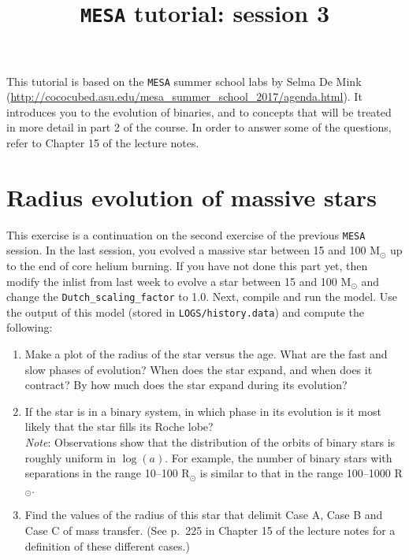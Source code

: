 \documentclass[11pt,a4paper]{article}
\begin{document}
\title{\textbf{\texttt{MESA} tutorial: session 3}}
\author{}
\date{}
\maketitle

\noindent
This tutorial is based on the \texttt{MESA} summer school labs by Selma De Mink (\url{http://cococubed.asu.edu/mesa_summer_school_2017/agenda.html}). It introduces you to the evolution of binaries, and to concepts that will be treated in more detail in part 2 of the course. In order to answer some of the questions, refer to Chapter 15 of the lecture notes.

\section{Radius evolution of massive stars}

This exercise is a continuation on the second exercise of the previous \texttt{MESA} session. In the last session, you evolved a massive star between 15 and 100 M$_\odot$ up to the end of core helium burning. If you have not done this part yet, then modify the inlist from last week to evolve a star between 15 and 100 M$_\odot$ and change the \verb|Dutch_scaling_factor| to 1.0. Next, compile and run the model. Use the output of this model (stored in \verb|LOGS/history.data|) and compute the following:
\begin{enumerate}
\item Make a plot of the radius of the star versus the age. What are the fast and slow phases of evolution? When does the star expand, and when does it contract? By how much does the star expand during its evolution?
\item If the star is in a binary system, in which phase in its evolution is it most likely that the star fills its Roche lobe?\\
\textit{Note}: Observations show that the distribution of the orbits of binary stars is roughly uniform in $\log(a)$. For example, the number of binary stars with separations in the range 10--100 R$_\odot$ is similar to that in the range 100--1000 R$_\odot$.
\item Find the values of the radius of this star that delimit Case A, Case B and Case C of mass transfer. (See p.\ 225 in Chapter 15 of the lecture notes for a definition of these different cases.)
\end{enumerate}
\end{document}
